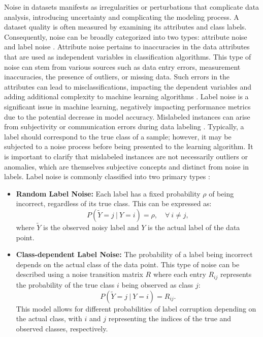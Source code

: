 \documentclass[12pt]{book}
\begin{document}
Noise in datasets manifests as irregularities or perturbations that complicate data analysis, introducing uncertainty and complicating the modeling process. A dataset quality is often measured by examining its attributes and class labels. Consequently, noise can be broadly categorized into two types: attribute noise and label noise \citep{frenay2013classification}. Attribute noise pertains to inaccuracies in the data attributes that are used as independent variables in classification algorithms. This type of noise can stem from various sources such as data entry errors, measurement inaccuracies, the presence of outliers, or missing data. Such errors in the attributes can lead to misclassifications, impacting the dependent variables and adding additional complexity to machine learning algorithms \citep{gupta2019dealing}. Label noise is a significant issue in machine learning, negatively impacting performance metrics due to the potential decrease in model accuracy. Mislabeled instances can arise from subjectivity or communication errors during data labeling \citep{angluin1988learning}. Typically, a label should correspond to the true class of a sample; however, it may be subjected to a noise process before being presented to the learning algorithm. It is important to clarify that mislabeled instances are not necessarily outliers or anomalies, which are themselves subjective concepts and distinct from noise in labels. Label noise is commonly classified into two primary types \citep{frenay2013classification}:
\begin{itemize}
    \item \textbf{Random Label Noise:} Each label has a fixed probability $\rho$ of being incorrect, regardless of its true class. This can be expressed as:
    \[
    P(\tilde{Y} = j \ | \ Y = i) = \rho, \quad \forall \ i \neq j,
    \]
    where $\tilde{Y}$ is the observed noisy label and $Y$ is the actual label of the data point.


    \item \textbf{Class-dependent Label Noise:} The probability of a label being incorrect depends on the actual class of the data point. This type of noise can be described using a noise transition matrix $R$ where each entry $R_{ij}$ represents the probability of the true class $i$ being observed as class $j$:
    \[
    P(\tilde{Y} = j \ | \ Y = i) = R_{ij}.
    \]
    This model allows for different probabilities of label corruption depending on the actual class, with $i$ and $j$ representing the indices of the true and observed classes, respectively.



\end{itemize}
\end{document}

